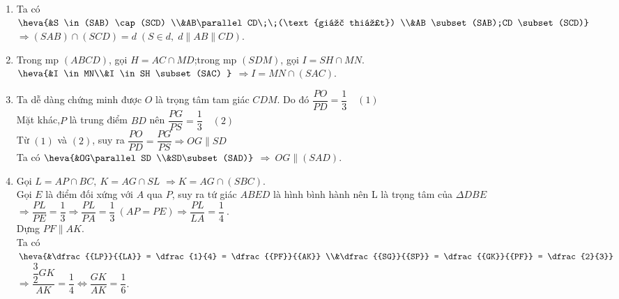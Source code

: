 \begin{bt}
{		\begin{enumerate}
			\item Ta  có
			$\heva{&S  \in (SAB) \cap (SCD) \\&AB\parallel CD\;\;(\text{giả thiết}) \\&AB \subset (SAB);CD \subset (SCD)}$
			$ \Rightarrow (SAB) \cap  (SCD) = d\;\left( {S \in d,\;d\parallel AB\parallel CD} \right)$.
			\item 
			 Trong mp $(ABCD)$, gọi $H=AC\cap MD$;trong mp $(SDM)$, gọi $I=SH\cap MN$.\\
			$\heva{&I \in MN\\&I  \in SH \subset (SAC) }$
			$ \Rightarrow I = MN  \cap (SAC)$.
			\item Ta dễ dàng  chứng minh được $O$ là trọng tâm tam giác $CDM$. Do đó $\dfrac{PO}{PD}=\dfrac{1}{3}\quad (1)$\\
			Mặt khác,$P$ là  trung điểm $BD$ nên $ \dfrac{PG}{PS}=\dfrac{1}{3} \quad (2)$\\
			Từ $(1)$ và $(2)$, suy ra $  \dfrac{PO}{PD}=\dfrac{PG}{PS}\Rightarrow OG$$\parallel$$SD$\\
			Ta có 
			$\heva{&OG\parallel SD \\&SD\subset  (SAD)}$
			$ \Rightarrow  \ OG\parallel(SAD)$.
			 \item
			Gọi $L=AP\cap BC,\ K=AG\cap SL$ $\Rightarrow K=AG\cap (SBC)$. \\Gọi $E$ là điểm đối xứng với $A$ qua $P$, suy ra tứ giác $ABED$ là  hình bình hành nên L là trọng tâm của $\Delta DBE$ $\Rightarrow \dfrac{PL}{PE}=\dfrac{1}{3}\Rightarrow \dfrac{PL}{PA}=\dfrac{1}{3}\ (AP=PE)\Rightarrow \dfrac{PL}{LA}=\dfrac{1}{4}\ $. \\
			Dựng $PF$$\parallel$$AK$.  \\
			 Ta có
			$\heva{&\dfrac{{LP}}{{LA}} = \dfrac{1}{4} =  \dfrac{{PF}}{{AK}} \\&\dfrac{{SG}}{{SP}} = \dfrac{{GK}}{{PF}} = \dfrac{2}{3}}$ $ \Rightarrow $$\dfrac{{\dfrac{3}{2}GK}}{{AK}} = \dfrac{1}{4} \Leftrightarrow \dfrac{{GK}}{{AK}} = \dfrac{1}{6}$.
		\end{enumerate}
	 }
\end{bt}

